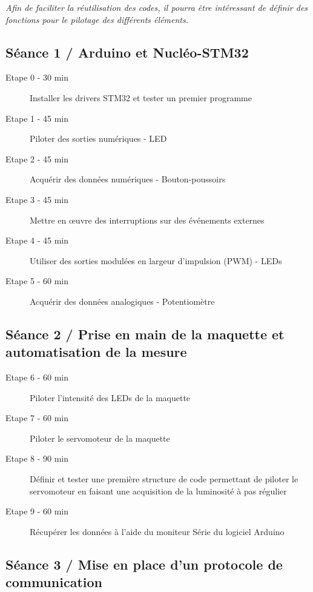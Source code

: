 \documentclass[a4paper,11pt,titlepage]{article} %
\begin{document}
\textit{Afin de faciliter la réutilisation des codes, il pourra être intéressant de définir des fonctions pour le pilotage des différents éléments.}

\subsection{Séance 1 / Arduino et Nucléo-STM32}

	\begin{description}
		\item[Etape 0 - 30 min] Installer les drivers STM32 et tester un premier programme
		\item[Etape 1 - 45 min] Piloter des sorties numériques - LED
		\item[Etape 2 - 45 min] Acquérir des données numériques - Bouton-poussoirs
		\item[Etape 3 - 45 min] Mettre en \oe{}uvre des interruptions sur des événements externes
		\item[Etape 4 - 45 min] Utiliser des sorties modulées en largeur d'impulsion (PWM) - LEDs
		\item[Etape 5 - 60 min] Acquérir des données analogiques - Potentiomètre
	\end{description}	

\subsection{Séance 2 / Prise en main de la maquette et automatisation de la mesure}

	\begin{description}
		\item[Etape 6 - 60 min] Piloter l'intensité des LEDs de la maquette
		\item[Etape 7 - 60 min] Piloter le servomoteur de la maquette
		\item[Etape 8 - 90 min] Définir et tester une première structure de code permettant de piloter le servomoteur en faisant une acquisition de la luminosité à pas régulier
		\item[Etape 9 - 60 min] Récupérer les données à l'aide du moniteur Série du logiciel Arduino
	\end{description}
	
\subsection{Séance 3 / Mise en place d'un protocole de communication}
\end{document}
